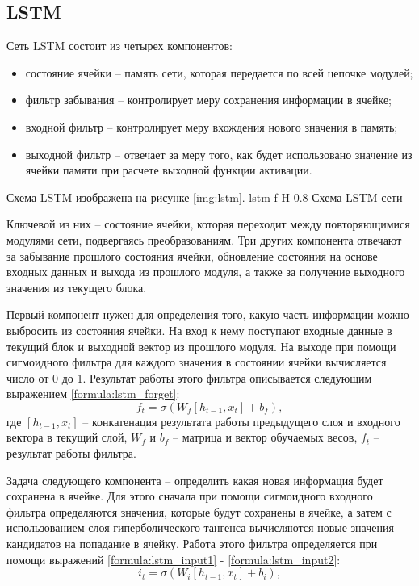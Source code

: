 \subsection{LSTM}
Сеть LSTM \cite{yu2019review} состоит из четырех компонентов:
\begin{itemize}
	\item состояние ячейки -- память сети, которая передается по всей цепочке модулей;
	\item фильтр забывания -- контролирует меру сохранения информации в ячейке;
	\item входной фильтр -- контролирует меру вхождения нового значения в память;
	\item выходной фильтр -- отвечает за меру того, как будет использовано значение из ячейки памяти при расчете выходной функции активации.
\end{itemize}

Схема LSTM изображена на рисунке \ref{img:lstm}.
{lstm} %
{f} %
{H} %
{0.8\textwidth} %
{Схема LSTM сети} %

Ключевой из них -- состояние ячейки, которая переходит между повторяющимися модулями сети, подвергаясь преобразованиям.
Три других компонента отвечают за забывание прошлого состояния ячейки, обновление состояния на основе входных данных и выхода из прошлого модуля, а также за получение выходного значения из текущего блока.

Первый компонент нужен для определения того, какую часть информации можно выбросить из состояния ячейки.
На вход к нему поступают входные данные в текущий блок и выходной вектор из прошлого модуля.
На выходе при помощи сигмоидного фильтра для каждого значения в состоянии ячейки вычисляется число от 0 до 1.
Результат работы этого фильтра описывается следующим выражением \ref{formula:lstm_forget}:
\begin{equation}\label{formula:lstm_forget}
	f_t = \sigma(W_f[h_{t-1}, x_t] + b_f),
\end{equation}
где $[h_{t-1}, x_t]$ -- конкатенация результата работы предыдущего слоя и входного вектора в текущий слой, $W_f$ и $b_f$ -- матрица и вектор обучаемых весов, $f_t$ -- результат работы фильтра.

Задача следующего компонента -- определить какая новая информация будет сохранена в ячейке.
Для этого сначала при помощи сигмоидного входного фильтра определяются значения, которые будут сохранены в ячейке, а затем с использованием слоя гиперболического тангенса вычисляются новые значения кандидатов на попадание в ячейку.
Работа этого фильтра определяется при помощи выражений \ref{formula:lstm_input1} - \ref{formula:lstm_input2}:
\begin{equation}\label{formula:lstm_input1}
	i_t = \sigma(W_i[h_{t-1}, x_t] + b_i),
\end{equation}

